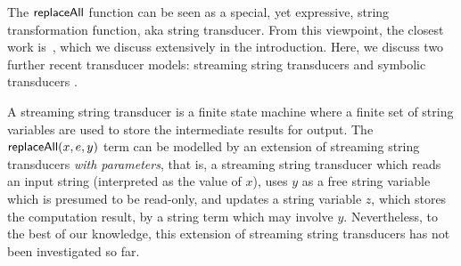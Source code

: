


The $\mathsf{replaceAll}$ function can be seen as a special, yet expressive, string transformation function, aka string transducer. From this viewpoint, the closest work is~\cite{LB16}, which we discuss extensively in the introduction. Here, we discuss two further 
recent transducer models: streaming string transducers \cite{AC10} and symbolic transducers \cite{symbolic-transducer}. 

A streaming string transducer is a finite state machine where  a finite set of string variables are used to store the intermediate results for output. The $\mathsf{replaceAll}(x, e, y)$ term can be modelled by an extension of streaming string transducers \emph{with parameters}, that is, a streaming string transducer which reads an input string (interpreted as the value of $x$), uses $y$ as a free string variable which is presumed to be read-only, and updates a string variable $z$, which stores the computation result, by a string term which may involve $y$. Nevertheless, to the best of our knowledge, this extension of streaming string transducers has not been investigated so far. 

